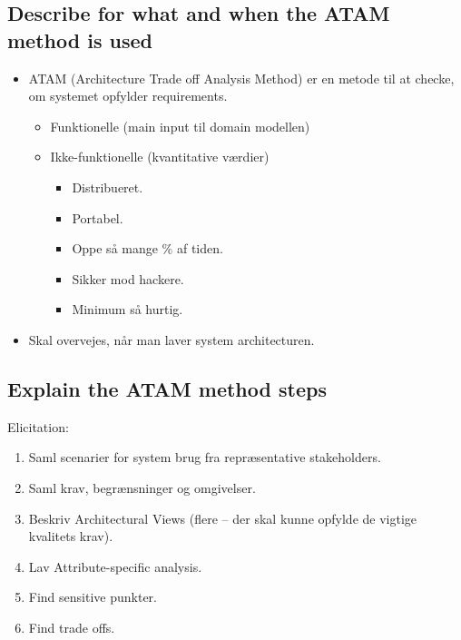 \documentclass{article}
\begin{document}
\subsection{Describe for what and when the ATAM method is used}
\begin{itemize}
	\item ATAM (Architecture Trade off Analysis Method) er en metode til at checke, om systemet opfylder requirements.
	\begin{itemize}
		\item Funktionelle (main input til domain modellen)
		\item Ikke-funktionelle  (kvantitative værdier)
		\begin{itemize}
			\item Distribueret.
			\item Portabel.
			\item Oppe så mange \% af tiden.
			\item Sikker mod hackere.
			\item Minimum så hurtig.
		\end{itemize}
	\end{itemize}
	\item Skal overvejes, når man laver system architecturen.
\end{itemize}


\subsection{Explain the ATAM method steps}

Elicitation:
\vspace{-10pt}
\begin{enumerate}
	\item Saml scenarier for system brug fra repræsentative stakeholders.
	\item Saml krav, begrænsninger og omgivelser.
	\item Beskriv Architectural Views (flere -- der skal kunne opfylde de vigtige kvalitets krav).
	\item Lav Attribute-specific analysis.
	\item Find sensitive punkter.
	\item Find trade offs.
\end{enumerate}
\end{document}
